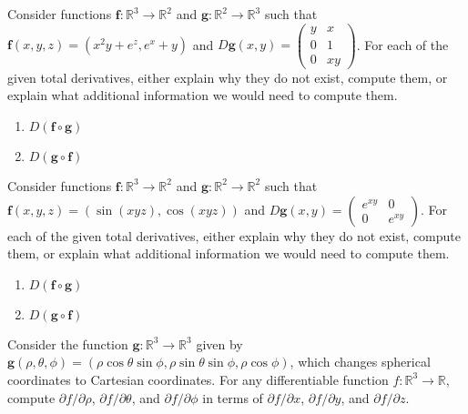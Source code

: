 \documentclass{ximera}
\begin{document}
\begin{problem}
 Consider functions $\mathbf{f}:\mathbb{R}^3\rightarrow\mathbb{R}^2$ and $\mathbf{g}:\mathbb{R}^2\rightarrow\mathbb{R}^3$ such that $\mathbf{f}(x,y,z) = (x^2y+e^z, e^x+y)$ and $D\mathbf{g}(x,y) = \left(\begin{array}{ccc}y&x\\0&1\\0&xy\end{array}\right)$. For each of the given total derivatives, either explain why they do not exist, compute them, or explain what additional information we would need to compute them.
\begin{enumerate}
\item $D(\mathbf{f}\circ\mathbf{g})$
\item $D(\mathbf{g}\circ\mathbf{f})$
\end{enumerate}
\end{problem}

\begin{problem} Consider functions $\mathbf{f}:\mathbb{R}^3\rightarrow\mathbb{R}^2$ and $\mathbf{g}:\mathbb{R}^2\rightarrow\mathbb{R}^2$ such that $\mathbf{f}(x,y,z) = (\sin(xyz),\cos(xyz))$ and $D\mathbf{g}(x,y) = \left(\begin{array}{ccc}e^{xy}&0\\0&e^{xy}\end{array}\right)$. For each of the given total derivatives, either explain why they do not exist, compute them, or explain what additional information we would need to compute them.
\begin{enumerate}
\item $D(\mathbf{f}\circ\mathbf{g})$
\item $D(\mathbf{g}\circ\mathbf{f})$
\end{enumerate}
\end{problem}

\begin{problem}
 Consider the function $\mathbf{g}:\mathbb{R}^3\rightarrow\mathbb{R}^3$ given by $\mathbf{g}(\rho, \theta, \phi) = (\rho\cos\theta\sin\phi, \rho\sin\theta\sin\phi,\rho\cos\phi)$, which changes spherical coordinates to Cartesian coordinates. For any differentiable function $f:\mathbb{R}^3\rightarrow\mathbb{R}$, compute $\partial f/\partial\rho$, $\partial f/\partial\theta$, and $\partial f/\partial\phi$ in terms of $\partial f/\partial x$, $\partial f/\partial y$, and $\partial f/\partial z$.
 \end{problem}
\end{document}

